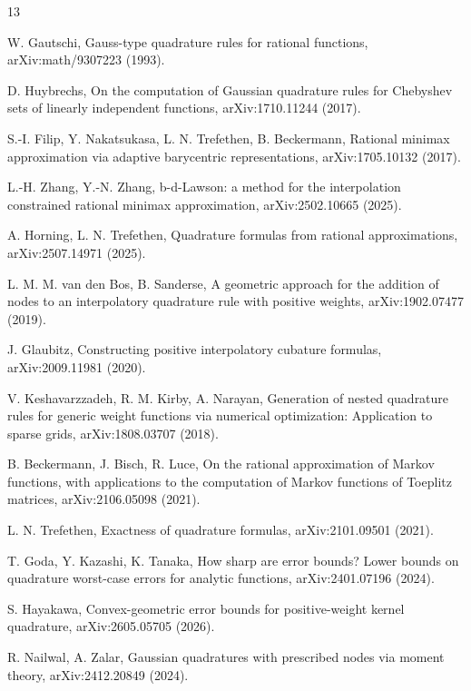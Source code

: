 \documentclass[preprint,12pt]{elsarticle}
\theoremstyle{remark}
\begin{document}
\begin{thebibliography}{13}
\providecommand{\url}[1]{\texttt{#1}}

W. Gautschi, Gauss-type quadrature rules for rational functions,
arXiv:math/9307223 (1993).

D. Huybrechs, On the computation of Gaussian quadrature rules for
Chebyshev sets of linearly independent functions,
arXiv:1710.11244 (2017).

S.-I. Filip, Y. Nakatsukasa, L. N. Trefethen, B. Beckermann,
Rational minimax approximation via adaptive barycentric
representations, arXiv:1705.10132 (2017).

L.-H. Zhang, Y.-N. Zhang, b-d-Lawson: a method for the interpolation
constrained rational minimax approximation,
arXiv:2502.10665 (2025).

A. Horning, L. N. Trefethen, Quadrature formulas from rational
approximations, arXiv:2507.14971 (2025).

L. M. M. van den Bos, B. Sanderse, A geometric approach for the
addition of nodes to an interpolatory quadrature rule with positive
weights, arXiv:1902.07477 (2019).

J. Glaubitz, Constructing positive interpolatory cubature formulas,
arXiv:2009.11981 (2020).

V. Keshavarzzadeh, R. M. Kirby, A. Narayan, Generation of nested
quadrature rules for generic weight functions via numerical
optimization: Application to sparse grids, arXiv:1808.03707 (2018).

B. Beckermann, J. Bisch, R. Luce, On the rational approximation of
Markov functions, with applications to the computation of Markov
functions of Toeplitz matrices, arXiv:2106.05098 (2021).

L. N. Trefethen, Exactness of quadrature formulas,
arXiv:2101.09501 (2021).

T. Goda, Y. Kazashi, K. Tanaka, How sharp are error bounds? Lower
bounds on quadrature worst-case errors for analytic functions,
arXiv:2401.07196 (2024).

S. Hayakawa, Convex-geometric error bounds for positive-weight kernel
quadrature, arXiv:2605.05705 (2026).

R. Nailwal, A. Zalar, Gaussian quadratures with prescribed nodes via
moment theory, arXiv:2412.20849 (2024).

\end{thebibliography}
\end{document}

